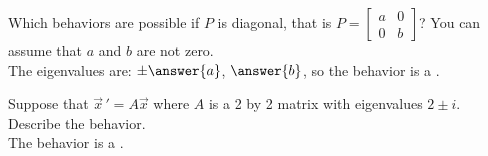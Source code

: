 \documentclass{ximera}
\begin{document}
\begin{exercise}
    Which behaviors are possible if $P$ is diagonal, that is $P = \left[ \begin{smallmatrix} a & 0 \\ 0 & b \end{smallmatrix} \right]$? You can assume that $a$ and $b$ are not zero.\\
    The eigenvalues are: $\pm \answer{a}$, $\answer{b}$, so the behavior is a .
\end{exercise}

\begin{exercise}%
    Suppose that $\vec{x}\,' = A \vec{x}$ where $A$ is a 2 by 2 matrix with eigenvalues $2\pm i$.  Describe the behavior.\\
    The behavior is a .
\end{exercise}
\end{document}
